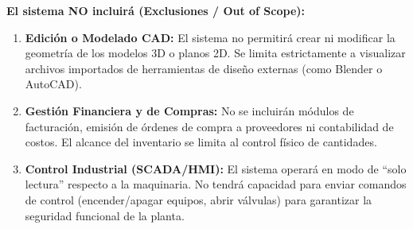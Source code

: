\textbf{El sistema NO incluirá (Exclusiones / Out of Scope):}
\begin{enumerate}
    \item \textbf{Edición o Modelado CAD:} El sistema no permitirá crear ni modificar la geometría de los modelos 3D o planos 2D. Se limita estrictamente a visualizar archivos importados de herramientas de diseño externas (como Blender o AutoCAD).
    \item \textbf{Gestión Financiera y de Compras:} No se incluirán módulos de facturación, emisión de órdenes de compra a proveedores ni contabilidad de costos. El alcance del inventario se limita al control físico de cantidades.
    \item \textbf{Control Industrial (SCADA/HMI):} El sistema operará en modo de ``solo lectura'' respecto a la maquinaria. No tendrá capacidad para enviar comandos de control (encender/apagar equipos, abrir válvulas) para garantizar la seguridad funcional de la planta.
\end{enumerate}

